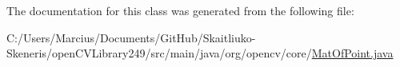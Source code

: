 The documentation for this class was generated from the following file\+:\begin{DoxyCompactItemize}
\item 
C\+:/\+Users/\+Marcius/\+Documents/\+Git\+Hub/\+Skaitliuko-\/\+Skeneris/open\+C\+V\+Library249/src/main/java/org/opencv/core/\mbox{\hyperlink{_mat_of_point_8java}{Mat\+Of\+Point.\+java}}\end{DoxyCompactItemize}
